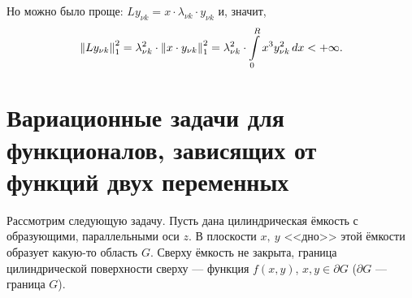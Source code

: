 Но можно было проще: $Ly_{\nu k}=x\cdot\lambda_{\nu k}\cdot y_{\nu k}$ и{\mb,} значит{\mb,}
\begin{equation*}
	\left\|Ly_{\nu k}\right\|_1^2=\lambda_{\nu k}^2\cdot\left\|x\cdot y_{\nu k}\right\|_1^2=\lambda_{\nu k}^2\cdot\int\limits_0^R x^3 y_{\nu k}^2\,dx<+\infty.
\end{equation*} 
\section[Функционалы, зависящие от функций двух переменных]{Вариационные задачи для функционалов, зависящих от функций двух переменных}
\label{lecture9section2}
Рассмотрим следующую задачу. Пусть дана цилиндрическая ёмкость с образующими{\mb,} параллельными оси $z$. В плоскости $x,\ y$ <<дно>> этой ёмкости образует какую-то область $G$. Сверху ёмкость не закрыта, граница цилиндрической поверхности сверху --- функция $f(x,y)$, $x,y\in\partial G$ ($\partial G$ --- граница $G$).


